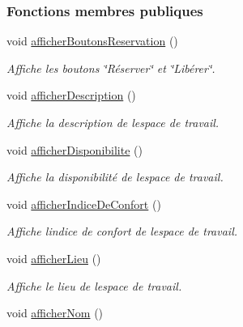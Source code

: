\subsubsection*{Fonctions membres publiques}
\begin{DoxyCompactItemize}
\item 
void \hyperlink{classcom_1_1lasalle_1_1meeting_1_1_affichage_espace_de_travail_a01e3d2585c84043dbe5086a2fc81c371}{afficher\+Boutons\+Reservation} ()
\begin{DoxyCompactList}\small\item\em Affiche les boutons \char`\"{}\+Réserver\char`\"{} et \char`\"{}\+Libérer\char`\"{}. \end{DoxyCompactList}\item 
void \hyperlink{classcom_1_1lasalle_1_1meeting_1_1_affichage_espace_de_travail_a4afb30e3faf37f738f6261fc0696d62b}{afficher\+Description} ()
\begin{DoxyCompactList}\small\item\em Affiche la description de l\textquotesingle{}espace de travail. \end{DoxyCompactList}\item 
void \hyperlink{classcom_1_1lasalle_1_1meeting_1_1_affichage_espace_de_travail_a597703fc6f7e82b79ac7047640fa9323}{afficher\+Disponibilite} ()
\begin{DoxyCompactList}\small\item\em Affiche la disponibilité de l\textquotesingle{}espace de travail. \end{DoxyCompactList}\item 
void \hyperlink{classcom_1_1lasalle_1_1meeting_1_1_affichage_espace_de_travail_acd704eb42f942a10a118d872ffe779a3}{afficher\+Indice\+De\+Confort} ()
\begin{DoxyCompactList}\small\item\em Affiche l\textquotesingle{}indice de confort de l\textquotesingle{}espace de travail. \end{DoxyCompactList}\item 
void \hyperlink{classcom_1_1lasalle_1_1meeting_1_1_affichage_espace_de_travail_a86fc32986ef9ae8f6ef7fca78d91f648}{afficher\+Lieu} ()
\begin{DoxyCompactList}\small\item\em Affiche le lieu de l\textquotesingle{}espace de travail. \end{DoxyCompactList}\item 
void \hyperlink{classcom_1_1lasalle_1_1meeting_1_1_affichage_espace_de_travail_a62159c3fd69a3d4f03306bd3e75c09ce}{afficher\+Nom} ()

\end{DoxyCompactItemize}
